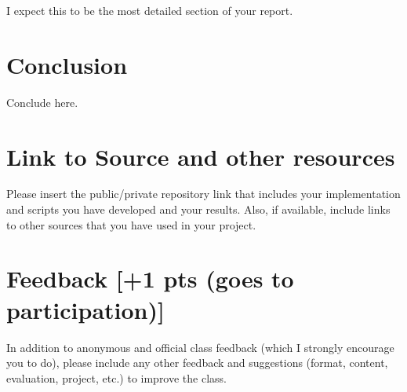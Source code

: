 \documentclass[sigconf,authorversion,nonacm]{acmart}
\begin{document}
 I expect this to be the most detailed section of your report.

\section{Conclusion} 
Conclude here.

\section{Link to Source and other resources} 
Please insert the public/private repository link that includes your implementation and scripts you have developed and your results. Also, if available, include links to other sources that you have used in your project.



\section{Feedback {\small {[+1 pts (goes to participation)]}}}  
In addition to anonymous and official class feedback (which I strongly encourage you to do), please include any other feedback and suggestions (format, content, evaluation, project, etc.) to improve the class.




\end{document}

